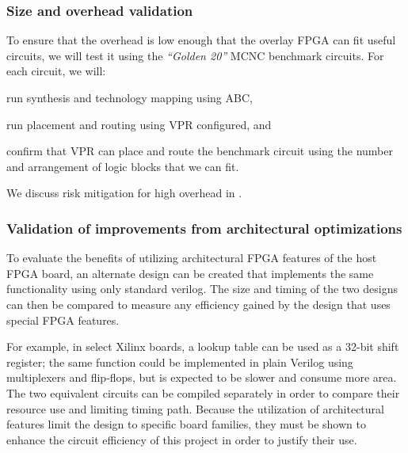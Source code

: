 \subsubsection{Size and overhead validation}

To ensure that the overhead is low enough that the overlay FPGA can fit useful circuits, we will test it using the \emph{``Golden 20''} MCNC benchmark circuits.
For each circuit, we will:
\begin{enumeration}
	\item run synthesis and technology mapping using ABC,
	\item run placement and routing using VPR configured, and
	\item confirm that VPR can place and route the benchmark circuit using the number and arrangement of logic blocks that we can fit.
\end{enumeration}
We discuss risk mitigation for high overhead in .


\subsubsection{Validation of improvements from architectural optimizations}

To evaluate the benefits of utilizing architectural FPGA features of the host FPGA board, an alternate design can be created that implements the same functionality using only standard verilog.
The size and timing of the two designs can then be compared to measure any efficiency gained by the design that uses special FPGA features.

For example, in select Xilinx boards, a lookup table can be used as a 32-bit shift register; the same function could be implemented in plain Verilog using multiplexers and flip-flops, but is expected to be slower and consume more area.
The two equivalent circuits can be compiled separately in order to compare their resource use and limiting timing path.
Because the utilization of architectural features limit the design to specific board families, they must be shown to enhance the circuit efficiency of this project in order to justify their use.

